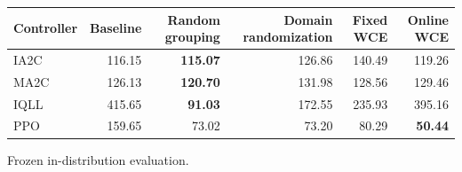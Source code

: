 \begin{tabular}{lrrrrr}
\hline
Controller & Baseline & Random grouping & Domain randomization & Fixed WCE & Online WCE \\
\hline
IA2C & 116.15 & \textbf{115.07} & 126.86 & 140.49 & 119.26 \\
MA2C & 126.13 & \textbf{120.70} & 131.98 & 128.56 & 129.46 \\
IQLL & 415.65 & \textbf{91.03} & 172.55 & 235.93 & 395.16 \\
PPO & 159.65 & 73.02 & 73.20 & 80.29 & \textbf{50.44} \\
\hline
\end{tabular}
Frozen in-distribution evaluation.
